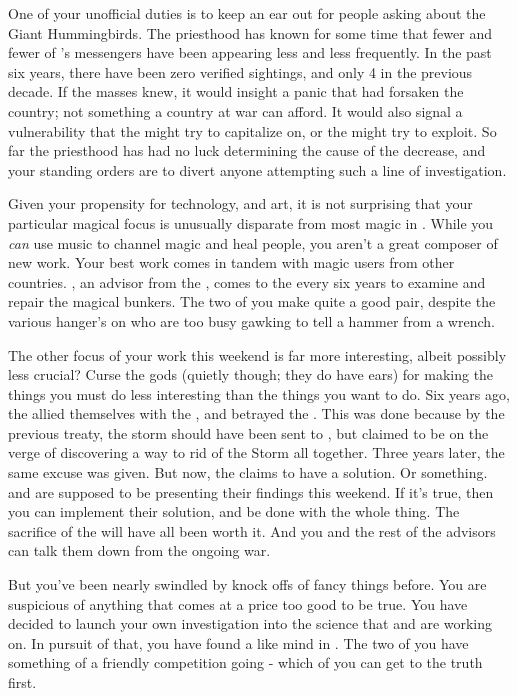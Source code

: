 \documentclass[char]{GL2020}
\begin{document}
One of your unofficial duties is to keep an ear out for people asking about the Giant Hummingbirds. The priesthood has known for some time that fewer and fewer of \cFarmGod{}’s messengers have been appearing less and less frequently. In the past six years, there have been zero verified sightings, and only 4 in the previous decade. If the masses knew, it would insight a panic that \cFarmGod{} had forsaken the country; not something a country at war can afford. It would also signal a vulnerability that the \pShippies{} might try to capitalize on, or the \pTechies{} might try to exploit. So far the priesthood has had no luck determining the cause of the decrease, and your standing orders are to divert anyone attempting such a line of investigation.

Given your propensity for technology, and art, it is not surprising that your particular magical focus is unusually disparate from most magic in \pFarm{}. While you \emph{can} use music to channel magic and heal people, you aren’t a great composer of new work. Your best work comes in tandem with magic users from other countries. \cBunker{}, an advisor from the \pShip{}, comes to the \pSchool{} every six years to examine and repair the magical bunkers. The two of you make quite a good pair, despite the various hanger’s on who are too busy gawking to tell a hammer from a wrench.

The other focus of your work this weekend is far more interesting, albeit possibly less crucial? Curse the gods (quietly though; they do have ears) for making the things you must do less interesting than the things you want to do. Six years ago, the \pFarm{} allied themselves with the \pTech{}, and betrayed the \pShip{}. This was done because by the previous treaty, the storm should have been sent to \pTech{}, but \pTech{} claimed to be on the verge of discovering a way to rid \pEarth{} of the Storm all together. Three years later, the same excuse was given. But now, the \pTech{} claims to have a solution. Or something. \cHeadScientist{} and \cAssistantScientist{} are supposed to be presenting their findings this weekend. If it’s true, then you can implement their solution, and be done with the whole thing. The sacrifice of the \pShip{} will have all been worth it. And you and the rest of the advisors can talk them down from the ongoing war.

But you’ve been nearly swindled by knock offs of fancy things before. You are suspicious of anything that comes at a price too good to be true. You have decided to launch your own investigation into the science that \cHeadScientist{} and \cAssistantScientist{} are working on. In pursuit of that, you have found a like mind in \cCurse{}. The two of you have something of a friendly competition going - which of you can get to the truth first. 
\end{document}
